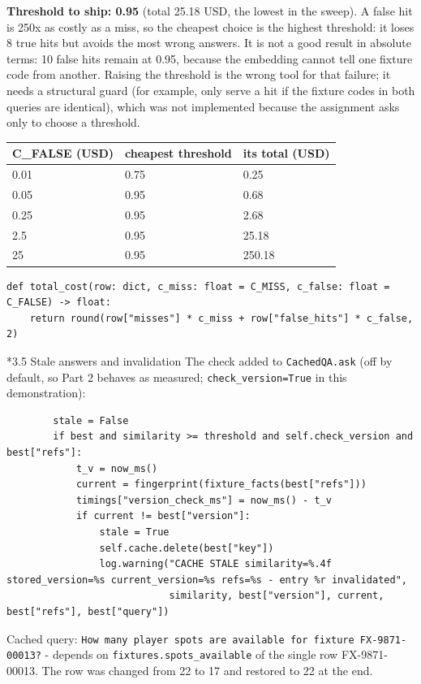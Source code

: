 \documentclass[11pt]{article}
\makeatletter
\renewcommand\subsection{\@startsection{subsection}{2}{\z@}{-2.2ex \@plus -1ex \@minus -.2ex}{0.8ex \@plus.2ex}{\normalfont\fontsize{12}{14.5}\selectfont\bfseries}}
\makeatother
\begin{document}
\textbf{Threshold to ship: 0.95} (total 25.18 USD, the lowest in the sweep). A false hit is 250x as costly as a miss, so the cheapest choice is the highest threshold: it loses 8 true hits but avoids the most wrong answers. It is not a good result in absolute terms: 10 false hits remain at 0.95, because the embedding cannot tell one fixture code from another. Raising the threshold is the wrong tool for that failure; it needs a structural guard (for example, only serve a hit if the fixture codes in both queries are identical), which was not implemented because the assignment asks only to choose a threshold.

\begin{center}
{\small
\begin{tabular}{lll}
\toprule
\textbf{C\_\allowbreak{}FALSE (USD)} & \textbf{cheapest threshold} & \textbf{its total (USD)} \\
\midrule
0.01 & 0.75 & 0.25 \\
0.05 & 0.95 & 0.68 \\
0.25 & 0.95 & 2.68 \\
2.5 & 0.95 & 25.18 \\
25 & 0.95 & 250.18 \\
\bottomrule
\end{tabular}}
\end{center}
\begingroup\lstset{basicstyle=\ttfamily\scriptsize}
\begin{lstlisting}
def total_cost(row: dict, c_miss: float = C_MISS, c_false: float = C_FALSE) -> float:
    return round(row["misses"] * c_miss + row["false_hits"] * c_false, 2)
\end{lstlisting}
\endgroup
\subsection*{3.5 Stale answers and invalidation}
The check added to \texttt{CachedQA.ask} (off by default, so Part 2 behaves as measured; \texttt{check\_\allowbreak{}version=True} in this demonstration):

\begingroup\lstset{basicstyle=\ttfamily\scriptsize}
\begin{lstlisting}
        stale = False
        if best and similarity >= threshold and self.check_version and best["refs"]:
            t_v = now_ms()
            current = fingerprint(fixture_facts(best["refs"]))
            timings["version_check_ms"] = now_ms() - t_v
            if current != best["version"]:
                stale = True
                self.cache.delete(best["key"])
                log.warning("CACHE STALE similarity=%.4f stored_version=%s current_version=%s refs=%s - entry %r invalidated",
                            similarity, best["version"], current, best["refs"], best["query"])
\end{lstlisting}
\endgroup
Cached query: \texttt{How many player spots are available for fixture FX-9871-00013?} - depends on \texttt{fixtures.spots\_\allowbreak{}available} of the single row FX-9871-00013. The row was changed from 22 to 17 and restored to 22 at the end.
\end{document}
